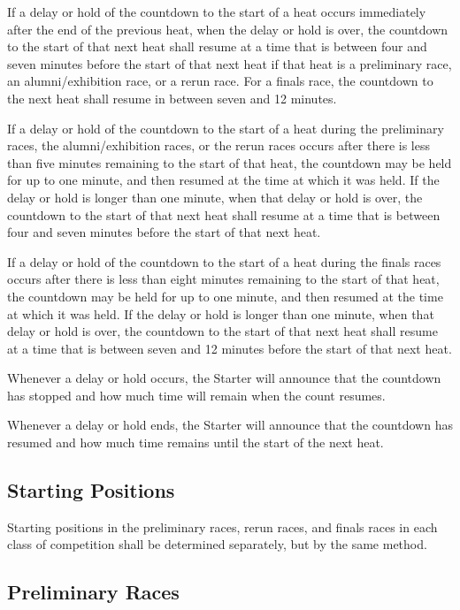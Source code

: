If a delay or hold of the countdown to the start of a heat occurs immediately after the end of the previous heat, when the delay or hold is over, the countdown to the start of that next heat shall resume at a time that is between four and seven minutes before the start of that next heat if that heat is a preliminary race, an alumni/exhibition race, or a rerun race. For a finals race, the countdown to the next heat shall resume in between seven and 12 minutes.

If a delay or hold of the countdown to the start of a heat during the preliminary races, the alumni/exhibition races, or the rerun races occurs after there is less than five minutes remaining to the start of that heat, the countdown may be held for up to one minute, and then resumed at the time at which it was held. If the delay or hold is longer than one minute, when that delay or hold is over, the countdown to the start of that next heat shall resume at a time that is between four and seven minutes before the start of that next heat.

If a delay or hold of the countdown to the start of a heat during the finals races occurs after there is less than eight minutes remaining to the start of that heat, the countdown may be held for up to one minute, and then resumed at the time at which it was held. If the delay or hold is longer than one minute, when that delay or hold is over, the countdown to the start of that next heat shall resume at a time that is between seven and 12 minutes before the start of that next heat.

Whenever a delay or hold occurs, the Starter will announce that the countdown has stopped and how much time will remain when the count resumes.

Whenever a delay or hold ends, the Starter will announce that the countdown has resumed and how much time remains until the start of the next heat.

\subsection{Starting Positions}

Starting positions in the preliminary races, rerun races, and finals races in each class of competition shall be determined separately, but by the same method.

\subsection{Preliminary Races}

